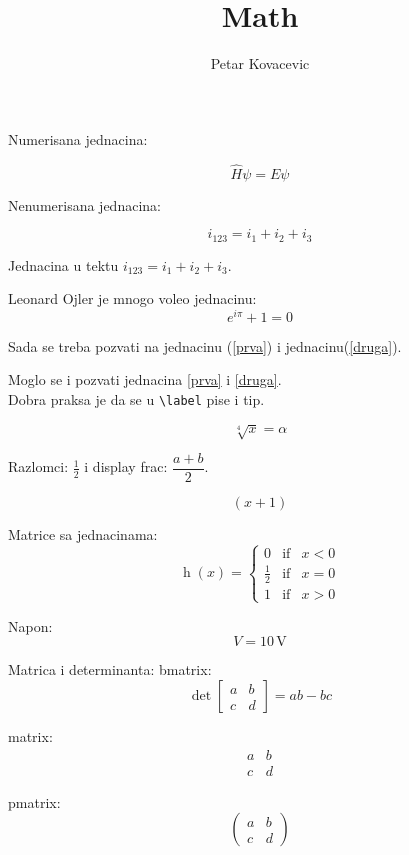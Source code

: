 \documentclass{article}
\title{Math}
\author{Petar Kovacevic}
\begin{document}
\maketitle

\bigskip

Numerisana jednacina:

\begin{equation} \label{prva}
	\hat H \psi = E \psi
\end{equation}

Nenumerisana jednacina:

\begin{equation}
		i_{123} = i_1 + i_2 + i_3  \label{druga}
\end{equation}

Jednacina u tektu $i_{123} = i_1 + i_2 + i_3$.

\clearpage

Leonard Ojler je mnogo voleo jednacinu:
\[ 
		e^{i\pi} + 1 = 0 
\]

Sada se treba pozvati na jednacinu (\ref{prva}) i jednacinu(\ref{druga}).

Moglo se i pozvati jednacina \ref{prva} i \eqref{druga}.\\
Dobra praksa je da se u \verb+\label+ pise i tip.

\[
	\sqrt[4]{x} = \alpha
\]

Razlomci: $\frac{1}{2}$ i display frac: $\dfrac{a+b}{2}$.

\[
	 \left( x + 1 \right)
\]

Matrice sa jednacinama:
\[
		\boxed{
		\operatorname{h}(x) = \left \{ 
		\begin{array}{lll}
				0             & \text{if}        &    x < 0 \\
				\frac{1}{2}   & \text{if}        &    x = 0 \\
				1             & \text{if}        &    x > 0
		\end{array}
	\right.
	}
\]

Napon:
\[
	\boxed{
		V = 10 \, \text{V}
	}
\]

Matrica i determinanta:
bmatrix:
\[
	\det \begin{bmatrix} 
		a & b \\
		c & d 
	\end{bmatrix}
	 = ab - bc 
\]

matrix:
\[
	\begin{matrix}
		a & b\\
			c & d
	\end{matrix}
\]

pmatrix:
\[
	\begin{pmatrix}
			a & b \\
			c & d
	\end{pmatrix}
\]
\end{document}
